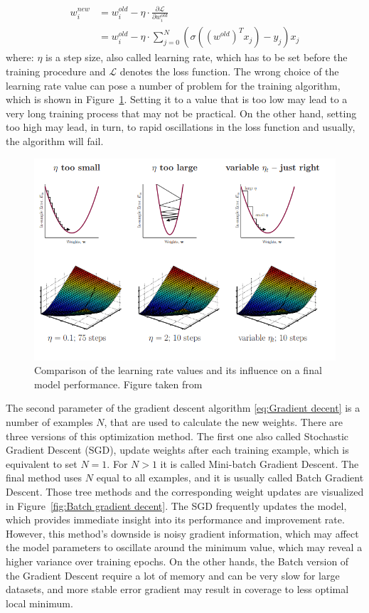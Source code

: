 \begin{align}
\label{eq:Gradient decent}
    w_{i}^{new} &= w_{i}^{old} - \eta \cdot \frac{\partial \mathcal{L}}{\partial w_{i}^{old}} \nonumber \\
    &= w_{i}^{old} - \eta  \cdot \sum_{j=0}^{N} \left( \sigma((w^{old})^{T}x_{j}) - y_{j} \right) x_j
\end{align}
where: $\eta$ is a step size, also called learning rate, which has to be set before the training procedure and $\mathcal{L}$ denotes the loss function. The wrong choice of the learning rate value can pose a number of problem for the training algorithm, which is shown in Figure~\ref{fig:Gradient decent}. Setting it to a value that is too low may lead to a very long training process that may not be practical. On the other hand, setting too high may lead, in turn, to rapid oscillations in the loss function and usually, the algorithm will fail.

\begin{figure}[!h]
\centering
\includegraphics{figures/LR_learning_rate.PNG}
\caption{Comparison of the learning rate values and its influence on a final model performance. Figure taken from~\cite{abu-musafa}  
\label{fig:Gradient decent}}
\end{figure}
The second parameter of the gradient descent algorithm \ref{eq:Gradient decent} is a number of examples $N$, that are used to calculate the new weights. There are three versions of this optimization method. The first one also called Stochastic Gradient Descent (SGD), update weights after each training example, which is equivalent to set $N=1$. For $N>1$ it is called Mini-batch Gradient Descent. The final method uses $N$ equal to all examples, and it is usually called Batch Gradient Descent. Those tree methods and the corresponding weight updates are visualized in Figure~\ref{fig:Batch gradient decent}. The SGD frequently updates the model, which provides immediate insight into its performance and improvement rate. However, this method's downside is noisy gradient information, which may affect the model parameters to oscillate around the minimum value, which may reveal a higher variance over training epochs. On the other hands, the Batch version of the Gradient Descent require a lot of memory and can be very slow for large datasets, and more stable error gradient may result in coverage to less optimal local minimum.

